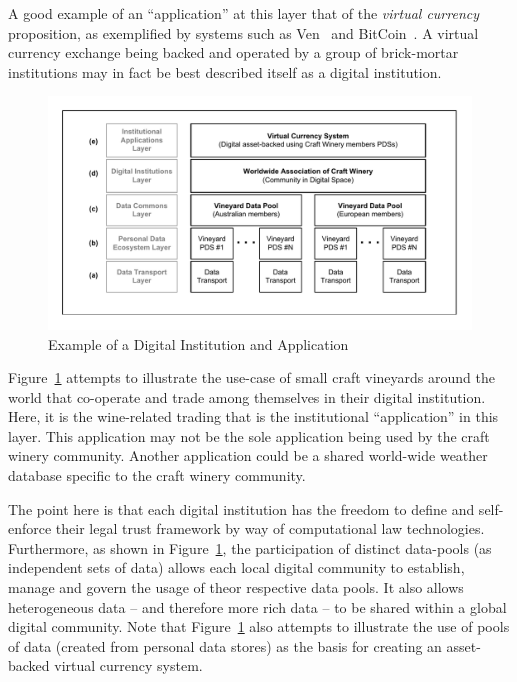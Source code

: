 \begin{description}
A good example of an ``application'' at this layer
that of the {\em virtual currency} proposition,
as exemplified by systems such as Ven~\cite{Stalnaker2013}
and BitCoin~\cite{BarberBoyen2012}.
A virtual currency exchange being backed and operated
by a group of brick-mortar institutions
may in fact be best described itself as a digital institution.

\begin{figure}[!t]
\centering
\includegraphics[width=7in]{figure-vineyard-stack}
\caption{Example of a Digital Institution and Application}
\label{fig:vineyard-stack}
\end{figure}


Figure~\ref{fig:vineyard-stack} attempts to illustrate
the use-case of small craft vineyards around the world
that co-operate and trade among themselves in their
digital institution.  
Here, it is the wine-related trading that is
the institutional ``application'' in this layer.
This application may not be the sole application being
used by the craft winery community.
Another application could be a shared world-wide weather
database specific to the craft winery community.

The point here is that each digital institution
has the freedom to define and self-enforce their
legal trust framework by way of computational law technologies.
Furthermore, as shown in Figure~\ref{fig:vineyard-stack},
the participation of distinct data-pools (as independent
sets of data) allows each local digital community
to establish, manage and govern the usage of theor respective
data pools.
It also allows heterogeneous data -- and therefore more rich data --
to be shared within a global digital community.
Note that Figure~\ref{fig:vineyard-stack} also attempts to illustrate
the use of pools of data (created from personal data stores)
as the basis for creating an asset-backed virtual currency system.






\end{description}



